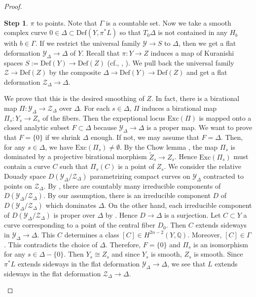 \documentclass[12pt,a4paper]{amsart}
\theoremstyle{remark}
\theoremstyle{definition}
\newtheorem{Step}{Step}
\begin{document}
\begin{proof}
\begin{Step}
$\pi$ to points. 
Note that $\Gamma$ is a countable set.   
Now we take a smooth complex curve $0\in \Delta \subset \mathrm{Def}(Y, \pi^*L)$ so that 
$T_0\Delta$ is not contained in any $H_b$ with $b \in \Gamma$.  
If we restrict the universal family $\mathcal{Y} \to S$ to 
$\Delta$, then we get a flat deformation $\mathcal{Y}_{\Delta} \to \Delta$ of $Y$. 
Recall that $\pi\colon Y \to Z$ induces a map of Kuranishi spaces $S := \mathrm{Def}(Y) \to \mathrm{Def}(Z)$ (cf., \cite[11.4]{KM}, 
\cite[\S 2, 2.1, 2.2]{Nam.def0}). 
We pull back the universal family $\mathcal{Z} \to \mathrm{Def}(Z)$ by the composite $\Delta \to \mathrm{Def}(Y) \to \mathrm{Def}(Z)$ and get a flat deformation $\mathcal{Z}_{\Delta} \to \Delta$. 

We prove that this is the desired smoothing of $Z$. 
In fact, there is a birational map $\Pi: \mathcal{Y}_{\Delta} \to \mathcal{Z}_{\Delta}$ over 
$\Delta$. For each $s \in \Delta$, $\Pi$ induces a birational map $\Pi_s: Y_s \to Z_s$ of the fibers. 
Then the expeptional locus 
$\mathrm{Exc}(\Pi)$ is mapped onto a closed analytic subset 
$F \subset \Delta$ because $\mathcal{Y}_{\Delta} \to \Delta$ is a proper map. 
We want to prove that $F = \{0\}$ if we shrink $\Delta$ enough. If not, we may assume that $F = \Delta$. Then, for any 
$s \in \Delta$, we have $\mathrm{Exc}(\Pi_s) \ne \emptyset$. By the Chow lemma \cite{Hironaka}, the map $\Pi_s$ is dominated by a projective birational morphism $\tilde{Z}_s \to Z_s$. Hence $\mathrm{Exc}(\Pi_s)$ must contain a curve $C$ such that $\Pi_s(C)$ is a point of $Z_s$. We consider the relative Douady space $D(\mathcal{Y}_{\Delta}/\mathcal{Z}_{\Delta})$ 
parametrizing compact curves  on $\mathcal{Y}_{\Delta}$ contracted to points on $\mathcal{Z}_{\Delta}$. 
By \cite{Fujiki 3}, there are countably many irreducible components of $D(\mathcal{Y}_{\Delta}/\mathcal{Z}_{\Delta})$. By our assumption, 
there is an irreducible component $D$ of $D(\mathcal{Y}_{\Delta}/\mathcal{Z}_{\Delta})$ which dominates $\Delta$. On the other hand,  
each irreducible component of $D(\mathcal{Y}_{\Delta}/\mathcal{Z}_{\Delta})$ is proper over $\Delta$ by \cite{Fujiki 4}. Hence 
$D \to \Delta$ 
is a surjection. Let $C \subset Y$ a curve corresponding to a point of the central fiber $D_0$. Then $C$ extends sideways in 
$\mathcal{Y}_{\Delta} \to \Delta$. This $C$ determines a class $[C] \in H^{2n-2}(Y, \mathbb{Q})$. Moreover, $[C] \in \Gamma$. 
This contradicts the choice of $\Delta$. Therefore, $F = \{0\}$ and $\Pi_s$ is an isomorphism for any $s \in \Delta - \{0\}$. 
Then $Y_s \cong Z_s$ and since $Y_s$ is smooth, $Z_s$ is smooth. Since $\pi^*L$ extends sideways in the flat deformation $\mathcal{Y}_{\Delta} \to \Delta$, we see that $L$ extends sideways in the flat deformation $\mathcal{Z}_{\Delta} \to \Delta$. 
\vspace{0.2cm}



\end{Step}
\end{proof}
\end{document}
